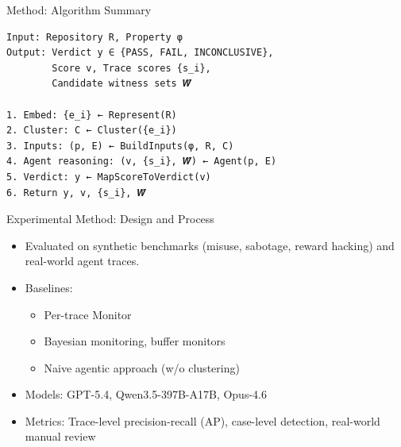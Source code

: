 \documentclass{beamer}
\newcommand{\alertterm}[1]{\alert{#1}}
\begin{document}
\begin{frame}[fragile]{Method: Algorithm Summary}
\begin{verbatim}
Input: Repository R, Property φ
Output: Verdict y ∈ {PASS, FAIL, INCONCLUSIVE},
        Score v, Trace scores {s_i},
        Candidate witness sets 𝑾̂

1. Embed: {e_i} ← Represent(R)
2. Cluster: C ← Cluster({e_i})
3. Inputs: (p, E) ← BuildInputs(φ, R, C)
4. Agent reasoning: (v, {s_i}, 𝑾̂) ← Agent(p, E)
5. Verdict: y ← MapScoreToVerdict(v)
6. Return y, v, {s_i}, 𝑾̂
\end{verbatim}
\label{alg:meerkat}
\end{frame}

\begin{frame}{Experimental Method: Design and Process}
\begin{itemize}
    \item Evaluated on \alertterm{synthetic benchmarks} (misuse, sabotage, reward hacking) and \alertterm{real-world agent traces}.
    \item Baselines:
    \begin{itemize}
        \item Per-trace \alertterm{Monitor}
        \item \alertterm{Bayesian monitoring}, buffer monitors
        \item Naive agentic approach (w/o clustering)
    \end{itemize}
    \item Models: GPT-5.4, Qwen3.5-397B-A17B, Opus-4.6
    \item Metrics: Trace-level precision-recall (AP), case-level detection, real-world manual review
\end{itemize}
\end{frame}
\end{document}
